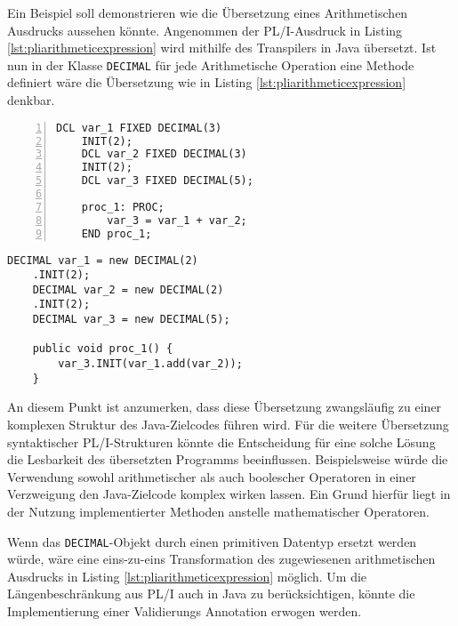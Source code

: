 Ein Beispiel soll demonstrieren wie die Übersetzung eines Arithmetischen Ausdrucks aussehen könnte.
Angenommen der PL/I-Ausdruck in Listing \ref{lst:pliarithmeticexpression} wird mithilfe des Transpilers in Java übersetzt.
Ist nun in der Klasse \verb+DECIMAL+ für jede Arithmetische Operation eine Methode definiert wäre die Übersetzung wie in Listing \ref{lst:pliarithmeticexpression} denkbar.

\begin{minipage}[b]{0.48\linewidth}{\newline}
	\centering
	\lstset{language=PL/I}
	\begin{lstlisting}[frame=single, numbers=left, mathescape,%
		caption={Transformation DECIMAL}, label={lst:pliarithmeticexpression}]
	DCL var_1 FIXED DECIMAL(3) 
	INIT(2);
	DCL var_2 FIXED DECIMAL(3) 
	INIT(2);
	DCL var_3 FIXED DECIMAL(5);
		
	proc_1: PROC;
		var_3 = var_1 + var_2;
	END proc_1;
	\end{lstlisting}
\end{minipage}
\hspace{0.5cm}
\begin{minipage}[b]{0.48\linewidth}
	\centering
	\lstset{language=Java}
	\begin{lstlisting}[frame=single, mathescape,%
		title={" "}]
	DECIMAL var_1 = new DECIMAL(2)
	.INIT(2);
	DECIMAL var_2 = new DECIMAL(2)
	.INIT(2);
	DECIMAL var_3 = new DECIMAL(5);
		
	public void proc_1() {
		var_3.INIT(var_1.add(var_2));
	}
	\end{lstlisting}
\end{minipage}

An diesem Punkt ist anzumerken, dass diese Übersetzung zwangsläufig zu einer komplexen Struktur des Java-Zielcodes führen wird. Für die weitere Übersetzung syntaktischer PL/I-Strukturen könnte die Entscheidung für eine solche Lösung die Lesbarkeit des übersetzten Programms beeinflussen. Beispielsweise würde die Verwendung sowohl arithmetischer als auch boolescher Operatoren in einer Verzweigung den Java-Zielcode komplex wirken lassen. Ein Grund hierfür liegt in der Nutzung implementierter Methoden anstelle mathematischer Operatoren.

Wenn das \verb+DECIMAL+-Objekt durch einen primitiven Datentyp ersetzt werden würde, wäre eine eins-zu-eins Transformation des zugewiesenen arithmetischen Ausdrucks in Listing \ref{lst:pliarithmeticexpression} möglich. Um die Längenbeschränkung aus PL/I auch in Java zu berücksichtigen, könnte die Implementierung einer Validierungs Annotation erwogen werden.

